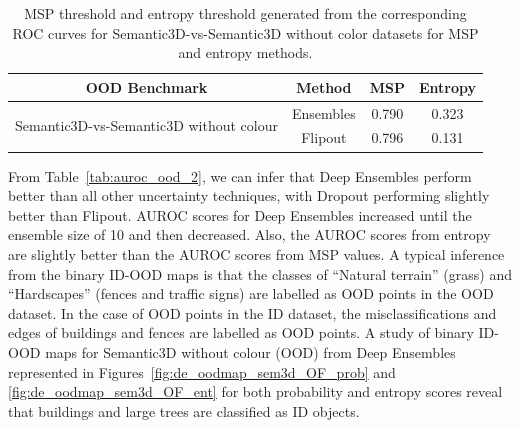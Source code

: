     \begin{table}[h!]
        \centering
        \begin{tabular}{cccc}
            \hline
            OOD Benchmark                                           & Method    & MSP   & Entropy \\ \hline
           \multirow{2}{*}{Semantic3D-vs-Semantic3D without colour} & Ensembles & 0.790 & 0.323   \\ 
                                                                   & Flipout   & 0.796 & 0.131   \\ \hline
        \end{tabular}
        \caption{MSP threshold and entropy threshold generated from the corresponding ROC curves for Semantic3D-vs-Semantic3D without color datasets for MSP and entropy methods.}
        \label{tab:thresholds_2}
    \end{table}
    From Table~\ref{tab:auroc_ood_2}, we can infer that Deep Ensembles perform better than all other uncertainty techniques, with Dropout performing slightly better than Flipout.
    AUROC scores for Deep Ensembles increased until the ensemble size of 10 and then decreased.
    Also, the AUROC scores from entropy are slightly better than the AUROC scores from MSP values.
    A typical inference from the binary ID-OOD maps is that the classes of ``Natural terrain'' (grass) and ``Hardscapes'' (fences and traffic signs) are labelled as OOD points in the OOD dataset.
    In the case of OOD points in the ID dataset, the misclassifications and edges of buildings and fences are labelled as OOD points.
    A study of binary ID-OOD maps for Semantic3D without colour (OOD) from Deep Ensembles represented in Figures~\ref{fig:de_oodmap_sem3d_OF_prob} and \ref{fig:de_oodmap_sem3d_OF_ent} for both probability and entropy scores reveal that buildings and large trees are classified as ID objects.
